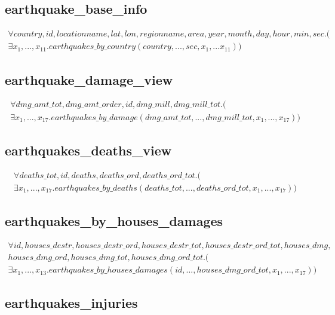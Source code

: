\documentclass{article}
\begin{document}
\subsection{earthquake\_base\_info}
\begin{multline}
\forall country, id, locationname, lat, lon, regionname, area, year, month, day, hour, min, sec.( \\
\exists x_1,..., x_{11}. 
earthquakes\_by\_country(country, ..., sec, 
x_1,... x_{11}))
\end{multline}


\subsection{earthquake\_damage\_view}

\begin{multline}
\forall dmg\_amt\_tot, dmg\_amt\_order, id, dmg\_mill, dmg\_mill\_tot.(\\
\exists x_1, ..., x_{17}. earthquakes\_by\_damage(dmg\_amt\_tot, ..., dmg\_mill\_tot, x_1, ..., x_{17}))
\end{multline} 

\subsection{earthquakes\_deaths\_view}

\begin{multline}
\forall deaths\_tot, id, deaths, deaths\_ord, deaths\_ord\_tot.(\\
\exists x_1, ..., x_{17}. earthquakes\_by\_deaths(deaths\_tot, ..., deaths\_ord\_tot, x_1, ..., x_{17}))
\end{multline} 

\subsection{earthquakes\_by\_houses\_damages}

\begin{multline}
\forall id, houses\_destr, houses\_destr\_ord, houses\_destr\_tot, houses\_destr\_ord\_tot, houses\_dmg, \\ houses\_dmg\_ord, houses\_dmg\_tot, houses\_dmg\_ord\_tot.(\\
\exists x_1, ..., x_{13}. earthquakes\_by\_houses\_damages(id, ..., houses\_dmg\_ord\_tot, x_1, ..., x_{17}))
\end{multline}

\subsection{earthquakes\_injuries}
\end{document}
